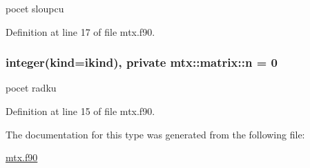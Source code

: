 pocet sloupcu 



\-Definition at line 17 of file mtx.\-f90.

\hypertarget{structmtx_1_1matrix_a548016c12d711ebbf9c748b9df0c68f8}{
\subsubsection[{n}]{\setlength{\rightskip}{0pt plus 5cm}integer(kind=ikind), private {\bf mtx\-::matrix\-::n} = 0}}\label{structmtx_1_1matrix_a548016c12d711ebbf9c748b9df0c68f8}


pocet radku 



\-Definition at line 15 of file mtx.\-f90.



\-The documentation for this type was generated from the following file\-:\begin{DoxyCompactItemize}
\item 
\hyperlink{mtx_8f90}{mtx.\-f90}\end{DoxyCompactItemize}
